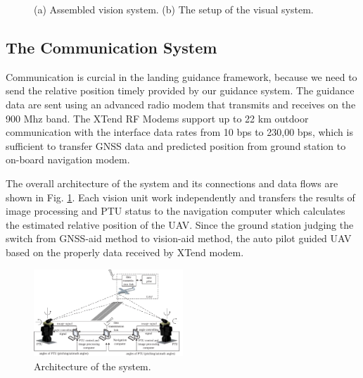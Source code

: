 \begin{figure}[!tb]
	\centering
	\caption{(a) Assembled vision system. (b) The setup of the visual system.}
\end{figure}



\subsection{The Communication System}
Communication is curcial in the landing guidance framework, because we need to send the relative position timely provided by our guidance system. 
The guidance data are sent using an advanced radio modem that transmits and receives on the 900 Mhz band. The XTend RF Modems support up to 22 km outdoor communication with the interface data rates from 10 bps to 230,00 bps, which is sufficient to transfer GNSS data and predicted position from ground station to on-board navigation modem.

The overall architecture of the system and its connections and data flows are shown in Fig. \ref{fig:SystemStructure}. Each vision unit work independently and transfers the results of image processing and PTU status to the navigation computer which calculates the estimated relative position of the UAV. Since the ground station judging the switch from GNSS-aid method to vision-aid method, the auto pilot guided UAV based on the properly data received by XTend modem. 

\begin{figure}[!tb]
	\centering
	\includegraphics[width=0.5\textwidth]{Figs/SystemStructure.pdf}
	\caption{Architecture of the system.}
	\label{fig:SystemStructure}
\end{figure}

